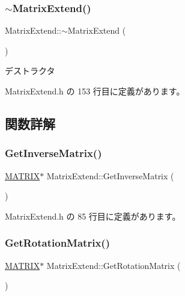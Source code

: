 \subsubsection{\texorpdfstring{$\sim$\+Matrix\+Extend()}{~MatrixExtend()}}
{\footnotesize\ttfamily Matrix\+Extend\+::$\sim$\+Matrix\+Extend (\begin{DoxyParamCaption}{ }\end{DoxyParamCaption})\hspace{0.3cm}{\ttfamily [inline]}}

デストラクタ 

 Matrix\+Extend.\+h の 153 行目に定義があります。



\subsection{関数詳解}
\mbox{\label{class_matrix_extend_aedfee5eb2eb7df8cac4b17045233748a}} 
\subsubsection{\texorpdfstring{Get\+Inverse\+Matrix()}{GetInverseMatrix()}}
{\footnotesize\ttfamily \mbox{\hyperlink{_vector3_d_8h_a032295cd9fb1b711757c90667278e744}{M\+A\+T\+R\+IX}}$\ast$ Matrix\+Extend\+::\+Get\+Inverse\+Matrix (\begin{DoxyParamCaption}{ }\end{DoxyParamCaption})\hspace{0.3cm}{\ttfamily [inline]}}



 Matrix\+Extend.\+h の 85 行目に定義があります。

\mbox{\label{class_matrix_extend_a6e10c2692b92f15ea4a1a69fc22c66c4}} 
\subsubsection{\texorpdfstring{Get\+Rotation\+Matrix()}{GetRotationMatrix()}}
{\footnotesize\ttfamily \mbox{\hyperlink{_vector3_d_8h_a032295cd9fb1b711757c90667278e744}{M\+A\+T\+R\+IX}}$\ast$ Matrix\+Extend\+::\+Get\+Rotation\+Matrix (\begin{DoxyParamCaption}{ }\end{DoxyParamCaption})\hspace{0.3cm}{\ttfamily [inline]}}



